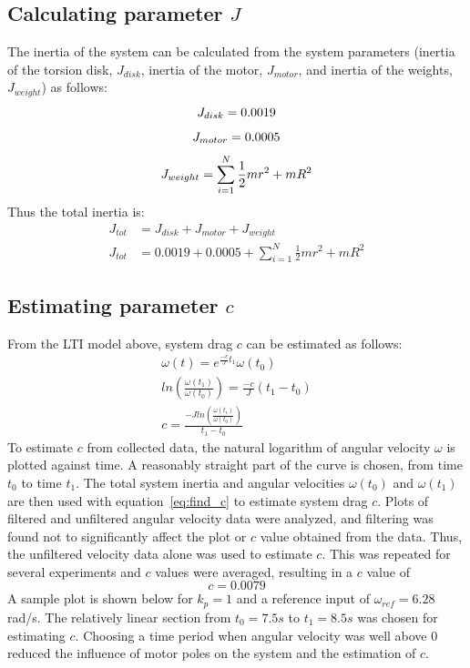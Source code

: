 \documentclass[11pt,titlepage]{article}
\begin{document}
	\subsection{Calculating parameter $J$}
	The inertia of the system can be calculated from the system parameters (inertia of the torsion disk, $J_{disk}$, inertia of the motor, $J_{motor}$, and inertia of the weights, $J_{weight}$) as follows:
	\begin{equation}\label{eq:lti} 
		J_{disk}=0.0019\\
	\end{equation}
	\begin{equation}
		J_{motor}=0.0005\\
	\end{equation}
	\begin{equation}
		J_{weight}=\sum\limits_{i=1}^{N} \frac{1}{2}mr^2 + mR^2\\
	\end{equation}
	Thus the total inertia is:
	\begin{align}
		J_{tot}&=J_{disk}+J_{motor}+J_{weight}\nonumber\\
		J_{tot}&=0.0019+0.0005+\sum\limits_{i=1}^{N} \frac{1}{2}mr^2 + mR^2
	\end{align}

	\subsection{Estimating parameter $c$}
	From the LTI model above, system drag $c$ can be estimated as follows:
	\begin{align}
		\omega(t)=e^{\frac{-c}{J}t_1}\omega(t_0)\nonumber\\
		ln\left( \frac{\omega(t_1)}{\omega(t_0)}\right)=\frac{-c}{J}(t_1-t_0)\nonumber\\
		c=\frac{-Jln\left(\frac{\omega(t_1)}{\omega(t_0)}\right)}{t_1-t_0}\label{eq:find_c}
	\end{align}
	To estimate $c$ from collected data, the natural logarithm of angular velocity $\omega$ is plotted against time. A reasonably straight part of the curve is chosen, from time $t_0$ to time $t_1$. The total system inertia and angular velocities $\omega(t_0)$ and $\omega(t_1)$ are then used with equation~\ref{eq:find_c} to estimate system drag $c$. Plots of filtered and unfiltered angular velocity data were analyzed, and filtering was found not to significantly affect the plot or $c$ value obtained from the data. Thus, the unfiltered velocity data alone was used to estimate $c$. This was repeated for several experiments and $c$ values were averaged, resulting in a $c$ value of 
	\begin{equation}
		c=0.0079\nonumber
	\end{equation}
	A sample plot is shown below for $k_p=1$ and a reference input of $\omega_{ref}=6.28$ rad/s. The relatively linear section from $t_0=7.5s$ to $t_1=8.5s$ was chosen for estimating $c$. Choosing a time period when angular velocity was well above 0 reduced the influence of motor poles on the system and the estimation of $c$.
	
\end{document}
